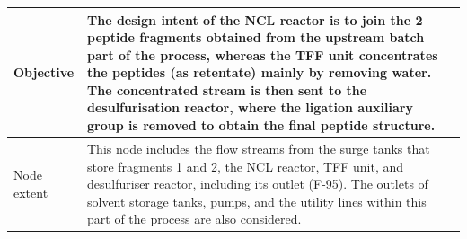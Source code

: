 \begin{table}[htbp]
\begin{tabularx}{\textwidth}{|>{\raggedright\arraybackslash}p{}|>{\raggedright\arraybackslash}X|}
        \hline
        Objective      & The design intent of the NCL reactor is to join the 2 peptide fragments obtained from the upstream batch part of the process, whereas the TFF unit concentrates the peptides (as retentate) mainly by removing water. The concentrated stream is then sent to the desulfurisation reactor, where the ligation auxiliary group is removed to obtain the final peptide structure. \\
        \hline
        Node extent    & This node includes the flow streams from the surge tanks that store fragments 1 and 2, the NCL reactor, TFF unit, and desulfuriser reactor, including its outlet (F-95). The outlets of solvent storage tanks, pumps, and the utility lines within this part of the process are also considered.                                                                                \\
        \hline
    \end{tabularx}
    \normalsize
\end{table}

